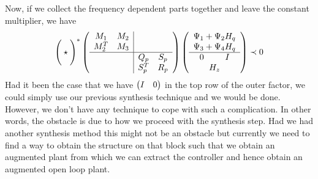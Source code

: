 Now, if we collect the frequency dependent parts together and leave the constant multiplier, we have 
\[
\Bigg(\star\Bigg)^*
\left(
\begin{array}{cc|cc}
M_1&M_2&&\\M^T_2&M_3&&\\\hline &&Q_p&S_p\\&&S_p^T&R_p
\end{array}
\right)
\left(
\begin{array}{>{\centering\arraybackslash$} p{0.7cm} <{$}>{\centering\arraybackslash$} p{0.7cm} <{$}}
	\multicolumn{2}{c}{\Psi_1 + \Psi_2H_q}\\
	\multicolumn{2}{c}{\Psi_3 + \Psi_4H_q}\\\hline
	0& I\\
	\multicolumn{2}{c}{H_z}
\end{array}
\right)
\prec 0
\]
Had it been the case that we have $\begin{pmatrix}I &0\end{pmatrix}$ in the top row of the outer factor, we could simply use our previous 
synthesis technique and we would be done. However, we don't have any technique to cope with such a complication. In other 
words, the obstacle is due to how we proceed with the synthesis step. Had we had another synthesis method this might
not be an obstacle but currently we need to find a way to obtain the structure on that block such that we obtain an 
augmented plant from which we can extract the controller and hence obtain an augmented open loop plant.


